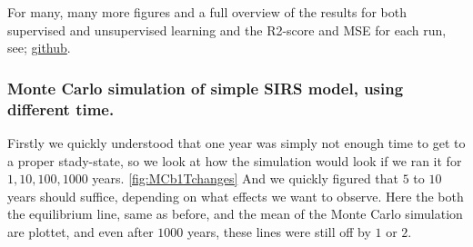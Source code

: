 	For many, many more figures and a full overview of the results for both supervised and unsupervised learning and the R2-score and MSE for each run, see; \href{https://github.com/sondrt/FYS-STK4155/tree/master/Project3/TEX/result}{github}.
 





\subsubsection{Monte Carlo simulation of simple SIRS model, using different time.}
	Firstly we quickly understood that one year was simply not enough time to get to a proper stady-state, so we look at how the simulation would look if we ran it for $1,10,100,1000$ years. \ref{fig:MCb1Tchanges} And we quickly figured that $5$ to $10$ years should suffice, depending on what effects we want to observe. Here the both the equilibrium line, same as before, and the mean of the Monte Carlo simulation are plottet, and even after $1000$ years, these lines were still off by $1$ or $2$. 

